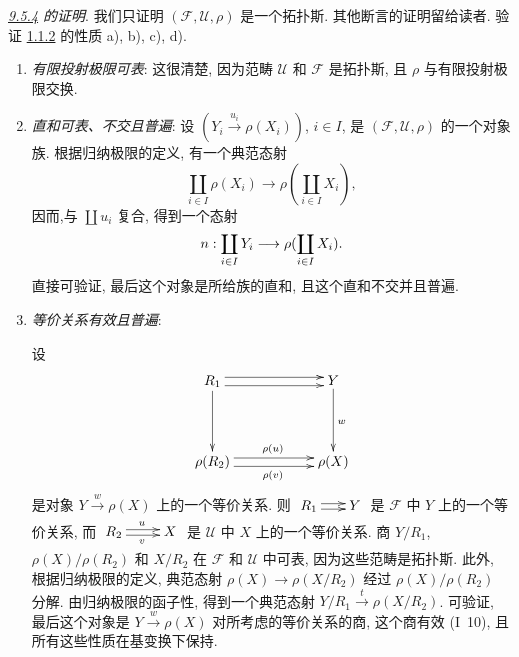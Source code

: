 \hypertarget{sga4.exp.IV.subsubsection.9.5.7}{}\subsubsection{}



\emph{\hyperref[IV.theo9.5.4]{9.5.4}  的证明}.
我们只证明 $(\mathcal{F},\mathcal{U},\rho)$ 是一个拓扑斯.
其他断言的证明留给读者.
验证 \hyperref[IV.subsubsec1.1.2]{1.1.2} 的性质 a), b), c), d).
\begin{enumerate}
\renewcommand{\theenumi}{\alph{enumi}}
\renewcommand{\labelenumi}{\theenumi)}
\item \emph{有限投射极限可表}:
这很清楚, 因为范畴 $\mathcal{U}$ 和 $\mathcal{F}$ 是拓扑斯,
且 $\rho$ 与有限投射极限交换.

\item \emph{直和可表、不交且普遍}:
设 $(Y_i\xrightarrow{u_i}\rho(X_i))$, $i\in I$,
是 $(\mathcal{F},\mathcal{U},\rho)$ 的一个对象族.
根据归纳极限的定义, 有一个典范态射
$$
\coprod_{i\in I}\rho(X_i)\longrightarrow\rho(\coprod_{i\in I}X_i),
$$
因而,\pageoriginale 与 $\coprod u_i$ 复合, 得到一个态射
$$
n:\coprod_{i\in I}Y_i\longrightarrow\rho(\coprod_{i\in I}X_i){}.
$$
直接可验证, 最后这个对象是所给族的直和,
且这个直和不交并且普遍.

\item \emph{等价关系有效且普遍}:

设
\[
\xymatrix@C=2cm@R=1.5cm{
R_1 \ar@<3pt>[r] \ar@<-3pt>[r] \ar[d]& Y \ar[d]^{w}\\
\rho(R_2) \ar@<3pt>[r]^{\rho(u)} \ar@<-3pt>[r]_{\rho(v)} & \rho(X) }
\]
是对象 $Y\xrightarrow{w}\rho(X)$ 上的一个等价关系.
则 $\xymatrix@C=.6cm{R_1\ar@<-2pt>[r]\ar@<2pt>[r]&Y}$
是 $\mathcal{F}$ 中 $Y$ 上的一个等价关系,
而 $\xymatrix{R_2\ar@<2pt>[r]^{u}\ar@<-2pt>[r]_{v}&X\\}$
是 $\mathcal{U}$ 中 $X$ 上的一个等价关系.
商 $Y/R_1$, $\rho(X)/\rho(R_2)$ 和 $X/R_2$
在 $\mathcal{F}$ 和 $\mathcal{U}$ 中可表,
因为这些范畴是拓扑斯.
此外, 根据归纳极限的定义,
典范态射 $\rho(X)\rightarrow\rho(X/R_2)$
经过 $\rho(X)/\rho(R_2)$ 分解.
由归纳极限的函子性, 得到一个典范态射
$Y/R_1\xrightarrow{t}\rho(X/R_2)$.
可验证, 最后这个对象是 $Y\xrightarrow{w}\rho(X)$ 对所考虑的等价关系的商,
这个商有效 (I~10), 且所有这些性质在基变换下保持.


\end{enumerate}
